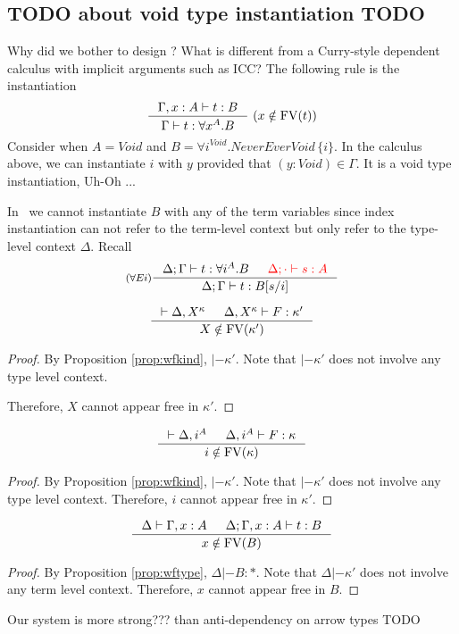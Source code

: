 \subsection{TODO about void type instantiation TODO}
Why did we bother to design \Fi? What is different from a Curry-style
dependent calculus with implicit arguments such as ICC? The following rule
is the instantiation 
\[
\inference{\Gamma,x:A |- t : B}{\Gamma |- t : \forall x^A.B }~(x\notin\FV(t))
\]
Consider when $A=Void$ and $B=\forall i^{Void}.NeverEverVoid\,\{i\}$.
In the calculus above, we can instantiate $i$ with $y$ provided that
$(y:Void)\in\Gamma$. It is a void type instantiation, Uh-Oh ...

In \Fi\ we cannot instantiate $B$ with any of the term variables
since index instantiation can not refer to the term-level context
but only refer to the type-level context $\Delta$. Recall
\[
	\inference[($\forall E i$)]{ \Delta;\Gamma |- t : \forall i^A.B & \textcolor{red}{\Delta;\cdot |- s:A} }
	                           {\Delta;\Gamma |- t : B[s/i]}
			   \]

\begin{proposition}
\[ \inference{ |- \Delta,X^\kappa
             & \Delta,X^\kappa |- F : \kappa' }
             { X\notin\FV(\kappa') }
\]
\end{proposition}
\begin{proof}
	By Proposition \ref{prop:wfkind}, $|- \kappa'$.
	Note that $|- \kappa'$ does not involve any type level context.

	Therefore, $X$ cannot appear free in $\kappa'$.
\end{proof}

\begin{proposition}
\[ \inference{ |- \Delta,i^A
             & \Delta,i^A |- F : \kappa }
             { i\notin\FV(\kappa) }
\]
\end{proposition}
\begin{proof}
	By Proposition \ref{prop:wfkind}, $|- \kappa'$.
	Note that $|- \kappa'$ does not involve any type level context.
	Therefore, $i$ cannot appear free in $\kappa'$.
\end{proof}

\begin{proposition}
\[ \inference{ \Delta |- \Gamma,x:A
             & \Delta;\Gamma,x:A |- t : B }
             { x\notin\FV(B) }
\]
\end{proposition}
\begin{proof}
	By Proposition \ref{prop:wftype}, $\Delta |- B:*$.
	Note that $\Delta |- \kappa'$ does not involve any term level context.
	Therefore, $x$ cannot appear free in $B$.
\end{proof}


\begin{remark} Our system is more strong??? than anti-dependency on arrow types
TODO
\end{remark}


